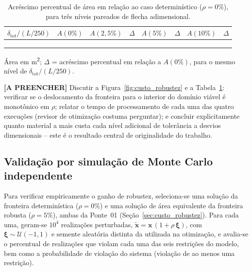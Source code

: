 \begin{table}[!ht]
\caption{Acréscimo percentual de área em relação ao caso determinístico ($\rho = 0\%$), para três níveis pareados de flecha adimensional.\label{tab:custo_robustez}}
\begin{threeparttable}
\begin{tabular*}{\columnwidth}{@{\extracolsep\fill}lccccccc@{\extracolsep\fill}}
\toprule
$\delta_{\mathrm{tot}}/(L/250)$ & $A(0\%)$ & $A(2{,}5\%)$ & $\Delta$ & $A(5\%)$ & $\Delta$ & $A(10\%)$ & $\Delta$ \\
\midrule
\tofill{--} & \tofill{--} & \tofill{--} & \tofill{--\%} & \tofill{--} & \tofill{--\%} & \tofill{--} & \tofill{--\%} \\
\tofill{--} & \tofill{--} & \tofill{--} & \tofill{--\%} & \tofill{--} & \tofill{--\%} & \tofill{--} & \tofill{--\%} \\
\tofill{--} & \tofill{--} & \tofill{--} & \tofill{--\%} & \tofill{--} & \tofill{--\%} & \tofill{--} & \tofill{--\%} \\
\bottomrule
\end{tabular*}
\begin{tablenotes}
\footnotesize
\item Área em m\textsuperscript{2}; $\Delta$ = acréscimo percentual em relação a $A(0\%)$, para o mesmo nível de $\delta_{\mathrm{tot}}/(L/250)$.
\end{tablenotes}
\end{threeparttable}
\end{table}

\begin{fillblock}
\noindent\textbf{[A PREENCHER]} Discutir a Figura~\ref{fig:custo_robustez} e a Tabela~\ref{tab:custo_robustez}: verificar se o deslocamento da fronteira para o interior do domínio viável é monotônico em $\rho$; relatar o tempo de processamento de cada uma das quatro execuções (revisor de otimização costuma perguntar); e concluir explicitamente quanto material a mais custa cada nível adicional de tolerância a desvios dimensionais -- este é o resultado central de originalidade do trabalho.
\end{fillblock}

\subsection{Validação por simulação de Monte Carlo independente}\label{sec:validacao_mc}

Para verificar empiricamente o ganho de robustez, seleciona-se uma solução da fronteira determinística ($\rho = 0\%$) e uma solução de área equivalente da fronteira robusta ($\rho = 5\%$), ambas da Ponte~01 (Seção~\ref{sec:custo_robustez}). Para cada uma, geram-se $10^4$ realizações perturbadas, $\tilde{\mathbf{x}} = \mathbf{x}\,(1+\rho\,\boldsymbol{\xi})$, com $\boldsymbol{\xi}\sim\mathcal{U}(-1,1)$ e semente aleatória distinta da utilizada na otimização, e avalia-se o percentual de realizações que violam cada uma das seis restrições do modelo, bem como a probabilidade de violação do sistema (violação de ao menos uma restrição).

